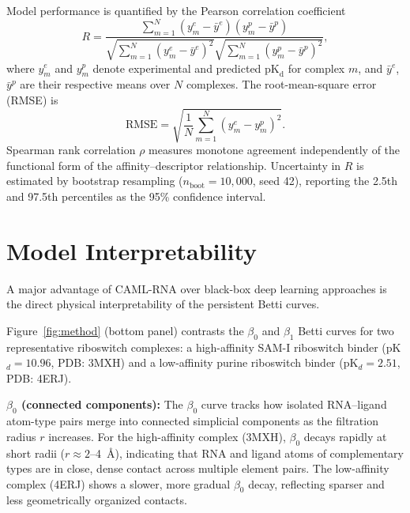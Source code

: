 \documentclass[10pt,twocolumn]{article}
\newcommand{\kD}{\text{pK}_{\mathrm{d}}}
\begin{document}
Model performance is quantified by the Pearson correlation coefficient
\begin{equation}
R = \frac{\sum_{m=1}^{N} (y_m^e - \bar{y}^e)(y_m^p - \bar{y}^p)}
         {\sqrt{\sum_{m=1}^{N}(y_m^e - \bar{y}^e)^2}
          \sqrt{\sum_{m=1}^{N}(y_m^p - \bar{y}^p)^2}},
\label{eq:pcc}
\end{equation}
where $y_m^e$ and $y_m^p$ denote experimental and predicted $\kD$ for complex $m$,
and $\bar{y}^e$, $\bar{y}^p$ are their respective means over $N$ complexes.
The root-mean-square error (RMSE) is
\begin{equation}
\text{RMSE} = \sqrt{\frac{1}{N} \sum_{m=1}^{N} (y_m^e - y_m^p)^2}.
\label{eq:rmse}
\end{equation}
Spearman rank correlation $\rho$ measures monotone agreement
independently of the functional form of the affinity--descriptor relationship.
Uncertainty in $R$ is estimated by bootstrap resampling ($n_{\mathrm{boot}} = 10{,}000$,
seed 42), reporting the 2.5th and 97.5th percentiles as the 95\% confidence interval.


\section{Model Interpretability}

A major advantage of CAML-RNA over black-box deep learning approaches is
the direct physical interpretability of the persistent Betti curves.

Figure~\ref{fig:method} (bottom panel) contrasts the $\beta_0$ and $\beta_1$
Betti curves for two representative riboswitch complexes:
a high-affinity SAM-I riboswitch binder (pK$_d = 10.96$, PDB: 3MXH)
and a low-affinity purine riboswitch binder (pK$_d = 2.51$, PDB: 4ERJ).

\textbf{$\beta_0$ (connected components):}
The $\beta_0$ curve tracks how isolated RNA--ligand atom-type pairs merge into
connected simplicial components as the filtration radius $r$ increases.
For the high-affinity complex (3MXH), $\beta_0$ decays rapidly at short radii
($r \approx 2$--4~\AA), indicating that RNA and ligand atoms of complementary types
are in close, dense contact across multiple element pairs.
The low-affinity complex (4ERJ) shows a slower, more gradual $\beta_0$ decay,
reflecting sparser and less geometrically organized contacts.
\end{document}
